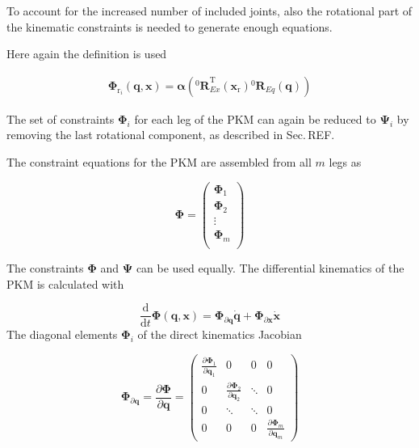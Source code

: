\documentclass[twocolumn,10pt]{IFTOMM}
\newcommand{\bm}[1]{\boldsymbol{#1}}
\newcommand{\rotmat}[2]{{{ }^{#1}\boldsymbol{R}}_{#2}}
\newcommand{\transp}[0]{{\mathrm{T}}}
\begin{document}
To account for the increased number of included joints, also the rotational part of the kinematic constraints is needed to generate enough equations.

Here again the definition is used

\begin{align}
\bm{\Phi}_{\mathrm{r}_i}(\bm{q},\bm{x})
=\bm{\alpha}\left(\rotmat{0}{Ex}^\transp (\bm{x}_{\mathrm{r}})\rotmat{0}{Eq}(\bm{q})\right)
\end{align}

The set of constraints $\bm{\Phi}_{i}$ for each leg of the PKM can again be reduced to $\bm{\Psi}_{i}$ by removing the last rotational component, as described in Sec.\,REF.

The constraint equations for the PKM are assembled from all $m$ legs as


\begin{equation}
\bm{\Phi}
=
\begin{pmatrix}
\bm{\Phi}_1 \\
\bm{\Phi}_2 \\
\vdots \\
\bm{\Phi}_m \\
\end{pmatrix}
\end{equation}

The constraints $\bm{\Phi}$ and $\bm{\Psi}$ can be used equally.
The differential kinematics of the PKM is calculated with




\begin{equation}
\frac{\mathrm{d}}{\mathrm{d}t} \bm{\Phi}(\bm{q},\bm{x})
=
\bm{\Phi}_{\partial \bm{q}}  \dot{\bm{q}}
+
\bm{\Phi}_{\partial \bm{x}} \dot{\bm{x}}
\end{equation}
%
The diagonal elements $\bm{\Phi}_i$ of the direct kinematics Jacobian %

\begin{equation}
\bm{\Phi}_{\partial \bm{q}}
=
\frac{\partial \bm{\Phi}}{\partial \bm{q}}
=
\begin{pmatrix}
\frac{\partial \bm{\Phi}_1}{\partial \bm{q}_1}  & 0 & 0 & 0\\
0 & \frac{\partial \bm{\Phi}_2}{\partial \bm{q}_2} & \ddots & 0  \\
0 & \ddots & \ddots & 0  \\
0 & 0 & 0 &\frac{\partial \bm{\Phi}_m}{\partial \bm{q}_m}
\end{pmatrix}
\end{equation}  
\end{document}
